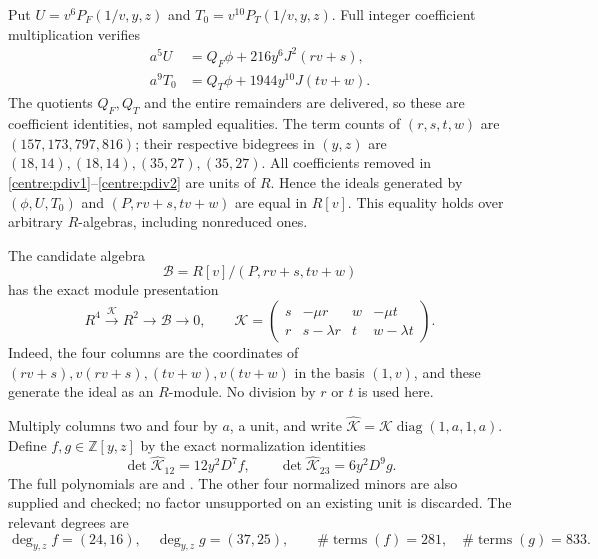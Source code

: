 \documentclass[11pt,a4paper]{article}
\theoremstyle{remark}\newtheorem{remark}[theorem]{Remark}
\begin{document}
Put $U=v^6P_F(1/v,y,z)$ and $T_0=v^{10}P_T(1/v,y,z)$. Full integer
coefficient multiplication verifies
\begin{align}
 a^5U&=Q_F\phi+216y^6J^2(rv+s),\label{centre:pdiv1}\\
 a^9T_0&=Q_T\phi+1944y^{10}J(tv+w).\label{centre:pdiv2}
\end{align}
The quotients $Q_F,Q_T$ and the entire remainders are delivered, so these
are coefficient identities, not sampled equalities. The term counts of
$(r,s,t,w)$ are $(157,173,797,816)$; their respective bidegrees in $(y,z)$
are $(18,14),(18,14),(35,27),(35,27)$. All coefficients removed in
\eqref{centre:pdiv1}--\eqref{centre:pdiv2} are units of $R$. Hence the
ideals generated by $(\phi,U,T_0)$ and $(P,rv+s,tv+w)$ are equal in
$R[v]$. This equality holds over arbitrary $R$-algebras, including
nonreduced ones.

The candidate algebra
\[
 \mathcal B=R[v]/(P,rv+s,tv+w)
\]
has the exact module presentation
\begin{equation}\label{centre:module}
 R^4\xrightarrow{\mathcal K}R^2\longrightarrow\mathcal B\longrightarrow0,
 \qquad
 \mathcal K=\begin{pmatrix}
 s&-\mu r&w&-\mu t\\r&s-\lambda r&t&w-\lambda t
 \end{pmatrix}.
\end{equation}
Indeed, the four columns are the coordinates of
$(rv+s),v(rv+s),(tv+w),v(tv+w)$ in the basis $(1,v)$, and these generate
the ideal as an $R$-module. No division by $r$ or $t$ is used here.

Multiply columns two and four by $a$, a unit, and write
$\widehat{\mathcal K}=\mathcal K\operatorname{diag}(1,a,1,a)$.
Define $f,g\in\mathbb Z[y,z]$ by the exact normalization identities
\[
 \det\widehat{\mathcal K}_{12}=12y^2D^7f,\qquad
 \det\widehat{\mathcal K}_{23}=6y^2D^9g.
\]
The full polynomials are  and .
The other four normalized minors are also supplied and checked; no factor
unsupported on an existing unit is discarded. The relevant degrees are
\[
 \deg_{y,z}f=(24,16),\quad \deg_{y,z}g=(37,25),\qquad
 \#\operatorname{terms}(f)=281,\quad\#\operatorname{terms}(g)=833.
\]
\end{document}
